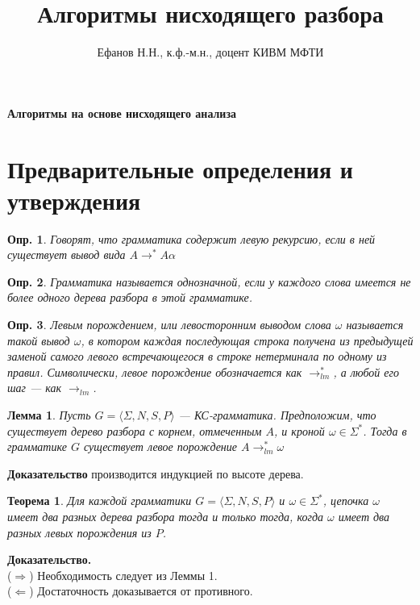 \documentclass[10pt]{article}         %
\title{Алгоритмы нисходящего разбора}
\author{Ефанов Н.Н., к.ф.-м.н., доцент КИВМ МФТИ}
\newtheorem{definition}{Опр.}
\newtheorem{lemm}{Лемма}
\newtheorem{theorem}{Теорема}
\begin{document}
	
	\maketitle
	
	\textbf{Алгоритмы на основе нисходящего анализа}
	
	\section{Предварительные определения и утверждения}
	\begin{definition}
		Говорят, что грамматика содержит левую рекурсию, если в ней существует вывод вида $A \to^* A\alpha$
	\end{definition}
	\begin{definition}
		Грамматика называется однозначной, если у каждого слова имеется не более одного дерева разбора в этой грамматике.
	\end{definition}
	\begin{definition}
		Левым порождением, или левосторонним выводом слова $\omega$
		называется такой вывод $\omega$, в котором каждая последующая строка получена из предыдущей заменой самого левого встречающегося в строке нетерминала по одному из правил. Символически, левое порождение обозначается как $\to^{*}_{lm}$, а любой его шаг --- как $\to_{lm}$.
	\end{definition}
	
	\begin{lemm}
	Пусть	$G = \langle \Sigma, N, S, P \rangle$ — КС-грамматика. Предположим, что существует дерево разбора с корнем, отмеченным $A$, и кроной  $\omega \in \Sigma^{*}$. Тогда в грамматике $G$ существует левое порождение $A \to^{*}_{lm} \omega$
	\end{lemm}
	\textbf{Доказательство} производится индукцией по высоте дерева.
	\begin{theorem}
		Для каждой грамматики $G = \langle \Sigma, N, S, P \rangle$ и $\omega \in \Sigma^{*}$, цепочка $\omega$ имеет два разных дерева разбора тогда и только тогда, когда $\omega$ имеет два разных левых порождения из $P$.
	\end{theorem}
	\textbf{Доказательство.}
	\\
	($\Rightarrow$) Необходимость следует из Леммы 1.
	\\
	($\Leftarrow$) Достаточность доказывается от противного.
	
\end{document}
